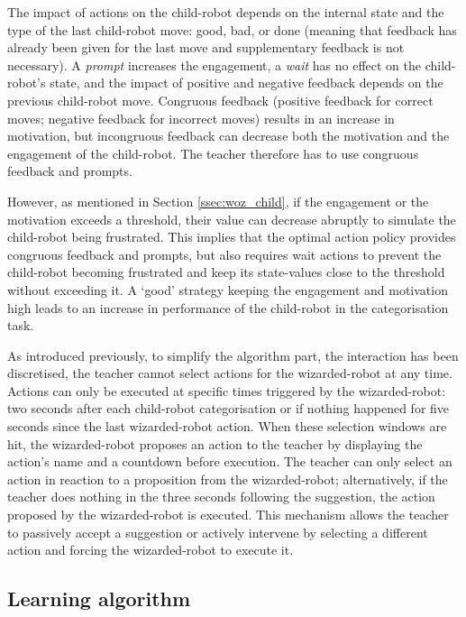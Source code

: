 The impact of actions on the child-robot depends on the internal state and the type of the last child-robot move: good, bad, or done (meaning that feedback has already been given for the last move and supplementary feedback is not necessary). A \textit{prompt} increases the engagement, a \textit{wait} has no effect on the child-robot's state, and the impact of positive and negative feedback depends on the previous child-robot move. Congruous feedback (positive feedback for correct moves; negative feedback for incorrect moves) results in an increase in motivation, but incongruous feedback can decrease both the motivation and the engagement of the child-robot. The teacher therefore has to use congruous feedback and prompts.

However, as mentioned in Section \ref{ssec:woz_child}, if the engagement or the motivation exceeds a threshold, their value can decrease abruptly to simulate the child-robot being frustrated. This implies that the optimal action policy provides congruous feedback and prompts, but also requires wait actions to prevent the child-robot becoming frustrated and keep its state-values close to the threshold without exceeding it. A `good' strategy keeping the engagement and motivation high leads to an increase in performance of the child-robot in the categorisation task.

As introduced previously, to simplify the algorithm part, the interaction has been discretised, the teacher cannot select actions for the wizarded-robot at any time. Actions can only be executed at specific times triggered by the wizarded-robot: two seconds after each child-robot categorisation or if nothing happened for five seconds since the last wizarded-robot action. When these selection windows are hit, the wizarded-robot proposes an action to the teacher by displaying the action's name and a countdown before execution. The teacher can only select an action in reaction to a proposition from the wizarded-robot; alternatively, if the teacher does nothing in the three seconds following the suggestion, the action proposed by the wizarded-robot is executed. This mechanism allows the teacher to passively accept a suggestion or actively intervene by selecting a different action and forcing the wizarded-robot to execute it.

\subsection{Learning algorithm}


